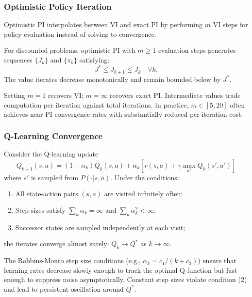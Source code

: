 \subsubsection{Optimistic Policy Iteration}

Optimistic PI interpolates between VI and exact PI by performing $m$ VI steps for policy evaluation instead of solving to convergence.

\begin{proposition}
\label{prop:optimistic_pi}
For discounted problems, optimistic PI with $m \geq 1$ evaluation steps generates sequences $\{J_k\}$ and $\{\pi_k\}$ satisfying:
\[
J^* \leq J_{k+1} \leq J_k \quad \forall k.
\]
The value iterates decrease monotonically and remain bounded below by $J^*$.
\end{proposition}

Setting $m = 1$ recovers VI; $m = \infty$ recovers exact PI. Intermediate values trade computation per iteration against total iterations. In practice, $m \in [5, 20]$ often achieves near-PI convergence rates with substantially reduced per-iteration cost.

\subsubsection{Q-Learning Convergence}

\begin{proposition}
\label{prop:qlearning}
Consider the Q-learning update
\[
Q_{k+1}(s,a) = (1-\alpha_k)Q_k(s,a) + \alpha_k \left[ r(s,a) + \gamma \max_{a'} Q_k(s',a') \right]
\]
where $s'$ is sampled from $P(\cdot|s,a)$. Under the conditions:
\begin{enumerate}
\item All state-action pairs $(s,a)$ are visited infinitely often;
\item Step sizes satisfy $\sum_{k} \alpha_k = \infty$ and $\sum_{k} \alpha_k^2 < \infty$;
\item Successor states are sampled independently at each visit;
\end{enumerate}
the iterates converge almost surely: $Q_k \to Q^*$ as $k \to \infty$.
\end{proposition}

The Robbins-Monro step size conditions (e.g., $\alpha_k = c_1/(k + c_2)$) ensure that learning rates decrease slowly enough to track the optimal Q-function but fast enough to suppress noise asymptotically. Constant step sizes violate condition (2) and lead to persistent oscillation around $Q^*$.

